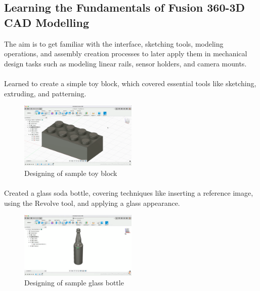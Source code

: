 \documentclass[../main]{subfiles}
\begin{document}

\subsection{Learning the Fundamentals of Fusion 360-3D CAD Modelling}

The aim is to get familiar with the interface, sketching tools, modeling
operations, and assembly creation processes to later apply them in mechanical
design tasks such as modeling linear rails, sensor holders, and camera mounts.

\paragraph{} Learned to create a simple toy block, which covered essential
tools like sketching, extruding, and patterning.

\begin{figure}
    \centering
    \includegraphics[width=0.5\textwidth,height=.2\textheight]{ss1.png}
    \caption{Designing of sample toy block} \label{pm}
\end{figure}

\paragraph{} Created a glass soda bottle, covering techniques like inserting a
reference image, using the Revolve tool, and applying a glass appearance.

\begin{figure}
    \centering
    \includegraphics[width=0.5\textwidth,height=.2\textheight]{ss2.png}
    \caption{Designing of sample glass bottle} \label{pm}
\end{figure}
\end{document}
